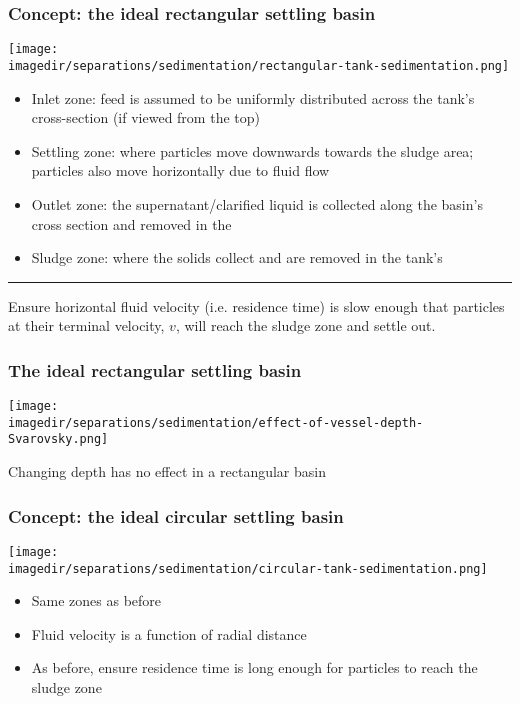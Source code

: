 \begin{frame}\frametitle{Concept: the ideal rectangular settling basin}
	\begin{center}
		\texttt{[image: \\imagedir/separations/sedimentation/rectangular-tank-sedimentation.png]}
	\end{center}
	{\scriptsize
	\begin{itemize}
		\item	Inlet zone: feed is assumed to be uniformly distributed across the tank's cross-section (if viewed from the top)
		\item	Settling zone: where particles move downwards towards the sludge area; particles also move horizontally due to fluid flow
		\item	Outlet zone: the supernatant/clarified liquid is collected along the basin's cross section and removed in the {}
		\item	Sludge zone: where the solids collect and are removed in the tank's {}
	\end{itemize}
	}
	\hrule
	Ensure horizontal fluid velocity (i.e. residence time) is slow enough that particles at their terminal velocity, $v$, will reach the sludge zone and settle out.
\end{frame}

\begin{frame}\frametitle{The ideal rectangular settling basin}
	\begin{center}
		\texttt{[image: \\imagedir/separations/sedimentation/effect-of-vessel-depth-Svarovsky.png]}
	\end{center}
	Changing depth has no effect in a rectangular basin 
\end{frame}

\begin{frame}\frametitle{Concept: the ideal circular settling basin}
	
	\begin{center}
		\texttt{[image: \\imagedir/separations/sedimentation/circular-tank-sedimentation.png]}
	\end{center}
	\begin{itemize}
		\item	Same zones as before
		\item	Fluid velocity is a function of radial distance
		\item	As before, ensure residence time is long enough for particles to reach the sludge zone
	\end{itemize}
\end{frame}

